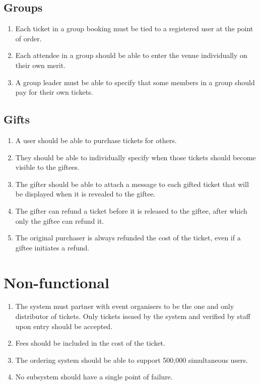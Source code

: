 \documentclass[12pt,a4paper]{bhamdissertation}
\begin{document}
\subsection{Groups}

\begin{enumerate}[resume]
    \item Each ticket in a group booking must be tied to a registered user at the point of order.
    \item Each attendee in a group should be able to enter the venue individually on their own merit.
    \item A group leader must be able to specify that some members in a group should pay for their own tickets.
\end{enumerate}

\subsection{Gifts}

\begin{enumerate}[resume]
    \item A user should be able to purchase tickets for others.
    \item They should be able to individually specify when those tickets should become visible to the giftees.
    \item The gifter should be able to attach a message to each gifted ticket that will be displayed when it is revealed to the giftee.
    \item The gifter can refund a ticket before it is released to the giftee, after which only the giftee can refund it.
    \item The original purchaser is always refunded the cost of the ticket, even if a giftee initiates a refund.
\end{enumerate}

\section{Non-functional}

\begin{enumerate}[resume]
    \item The system must partner with event organisers to be the one and only distributor of tickets. Only tickets issued by the system and verified by staff upon entry should be accepted.
    \item Fees should be included in the cost of the ticket.
    \item The ordering system should be able to support 500,000 simultaneous users.
    \item No subsystem should have a single point of failure.
\end{enumerate}
\end{document}
